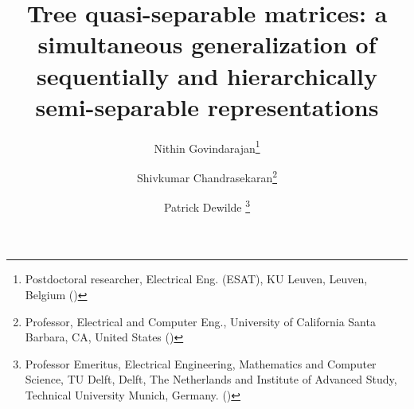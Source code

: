 

\usepackage{color}
\usepackage{lipsum}
\usepackage{amsfonts}
\usepackage{graphicx}
\usepackage{caption}
\usepackage{subcaption}
\usepackage{epstopdf}
\usepackage{calc}
\ifpdf
\else
\fi

\newcommand{\creflastconjunction}{, and~}



\title{Tree quasi-separable matrices: a simultaneous generalization of sequentially and hierarchically semi-separable representations
}

\author{Nithin Govindarajan\thanks{{Postdoctoral researcher, Electrical Eng. (ESAT), KU Leuven, Leuven, Belgium
  ()}}
  \and Shivkumar Chandrasekaran\thanks{Professor, Electrical and Computer Eng., University of California Santa Barbara, CA, United States
  ()} 
  \and
  Patrick Dewilde \thanks{Professor Emeritus, Electrical Engineering, Mathematics and Computer Science, TU Delft, Delft, The Netherlands and Institute of Advanced Study, Technical University Munich, Germany.
  ()} 
  }






\usepackage{amsopn}
\DeclareMathOperator{\diag}{diag}


